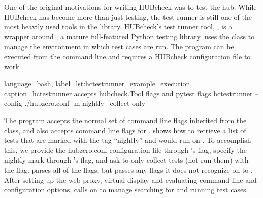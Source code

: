 One of the original motivations for writing HUBcheck was to test the hub. While
HUBcheck has become more than just testing, the test runner is still one of the
most heavily used tools in the library. HUBcheck's test runner tool,
, is a wrapper around , a mature
full-featured Python testing library.  uses the
 class to manage the environment in which test cases are
run. The program can be executed from the command line and requires a HUBcheck
configuration file to work.


\begin{xcode}{%
  language=bash,%
  label=lst:hctestrunner_example_execution,%
  caption={hctestrunner accepts hubcheck.Tool flags and pytest flags}%
}
hctestrunner --config ./hubzero.conf -m nightly --collect-only
\end{xcode}

The  program accepts the normal set of command line
flags inherited from the  class, and also accepts
command line flags for .
 shows how to retrieve a list of tests
that are marked with the tag ``nightly'' and would run on
. To accomplish this, we provide the hubzero.conf
configuration file through 's 
flag, specify the nightly mark through 's
 flag, and ask  to only collect tests
(not run them) with the  flag.
 parses all of the flags, but passes any flags it
does not recognize on to .  After setting up the web
proxy, virtual display and evaluating command line and configuration options,
 calls on  to manage
searching for and running test cases.




